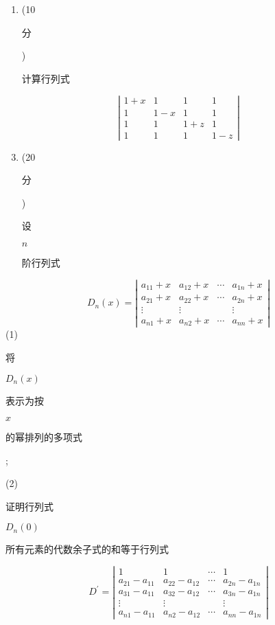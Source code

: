\documentclass[10pt]{article}
\begin{document}
\begin{enumerate}
  \item (10 \begin{CJK}{UTF8}{mj}分\end{CJK}) \begin{CJK}{UTF8}{mj}计算行列式\end{CJK}
\end{enumerate}
$$
\left|\begin{array}{cccc}
1+x & 1 & 1 & 1 \\
1 & 1-x & 1 & 1 \\
1 & 1 & 1+z & 1 \\
1 & 1 & 1 & 1-z
\end{array}\right|
$$

\begin{enumerate}
  \setcounter{enumi}{2}
  \item (20 \begin{CJK}{UTF8}{mj}分\end{CJK}) \begin{CJK}{UTF8}{mj}设\end{CJK} $n$ \begin{CJK}{UTF8}{mj}阶行列式\end{CJK}
\end{enumerate}
$$
D_{n}(x)=\left|\begin{array}{cccc}
a_{11}+x & a_{12}+x & \cdots & a_{1 n}+x \\
a_{21}+x & a_{22}+x & \cdots & a_{2 n}+x \\
\vdots & \vdots & & \vdots \\
a_{n 1}+x & a_{n 2}+x & \cdots & a_{n n}+x
\end{array}\right|
$$
(1) \begin{CJK}{UTF8}{mj}将\end{CJK} $D_{n}(x)$ \begin{CJK}{UTF8}{mj}表示为按\end{CJK} $x$ \begin{CJK}{UTF8}{mj}的幂排列的多项式\end{CJK};

(2) \begin{CJK}{UTF8}{mj}证明行列式\end{CJK} $D_{n}(0)$ \begin{CJK}{UTF8}{mj}所有元素的代数余子式的和等于行列式\end{CJK}
$$
D^{\prime}=\left|\begin{array}{cccc}
1 & 1 & \cdots & 1 \\
a_{21}-a_{11} & a_{22}-a_{12} & \cdots & a_{2 n}-a_{1 n} \\
a_{31}-a_{11} & a_{32}-a_{12} & \cdots & a_{3 n}-a_{1 n} \\
\vdots & \vdots & & \vdots \\
a_{n 1}-a_{11} & a_{n 2}-a_{12} & \cdots & a_{n n}-a_{1 n}
\end{array}\right|
$$
\end{document}
